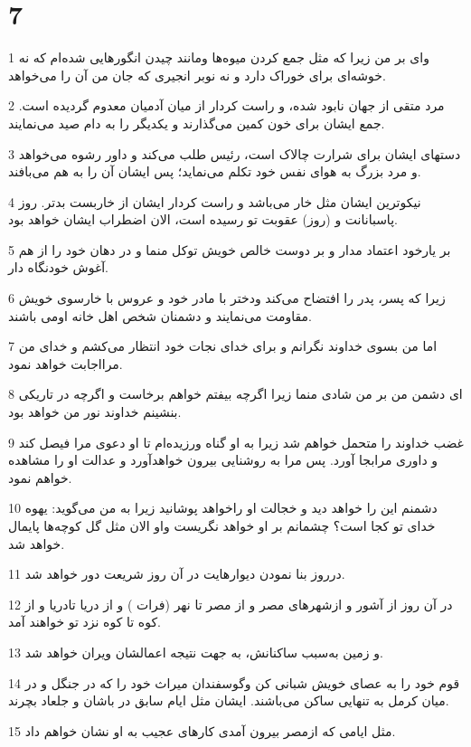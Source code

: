 \chapter{7}

\par 1 وای بر من زیرا که مثل جمع کردن میوه‌ها ومانند چیدن انگورهایی شده‌ام که نه خوشه‌ای برای خوراک دارد و نه نوبر انجیری که جان من آن را می‌خواهد.
\par 2 مرد متقی از جهان نابود شده، و راست کردار از میان آدمیان معدوم گردیده است. جمع ایشان برای خون کمین می‌گذارند و یکدیگر را به دام صید می‌نمایند.
\par 3 دستهای ایشان برای شرارت چالاک است، رئیس طلب می‌کند و داور رشوه می‌خواهد و مرد بزرگ به هوای نفس خود تکلم می‌نماید؛ پس ایشان آن را به هم می‌بافند.
\par 4 نیکوترین ایشان مثل خار می‌باشد و راست کردار ایشان از خاربست بدتر. روز پاسبانانت و (روز) عقوبت تو رسیده است، الان اضطراب ایشان خواهد بود.
\par 5 بر یارخود اعتماد مدار و بر دوست خالص خویش توکل منما و در دهان خود را از هم آغوش خودنگاه دار.
\par 6 زیرا که پسر، پدر را افتضاح می‌کند ودختر با مادر خود و عروس با خارسوی خویش مقاومت می‌نمایند و دشمنان شخص اهل خانه اومی باشند.
\par 7 اما من بسوی خداوند نگرانم و برای خدای نجات خود انتظار می‌کشم و خدای من مرااجابت خواهد نمود.
\par 8 ‌ای دشمن من بر من شادی منما زیرا اگر‌چه بیفتم خواهم برخاست و اگرچه در تاریکی بنشینم خداوند نور من خواهد بود.
\par 9 غضب خداوند را متحمل خواهم شد زیرا به او گناه ورزیده‌ام تا او دعوی مرا فیصل کند و داوری مرابجا آورد. پس مرا به روشنایی بیرون خواهدآورد و عدالت او را مشاهده خواهم نمود.
\par 10 دشمنم این را خواهد دید و خجالت او راخواهد پوشانید زیرا به من می‌گوید: یهوه خدای تو کجا است؟ چشمانم بر او خواهد نگریست واو الان مثل گل کوچه‌ها پایمال خواهد شد.
\par 11 درروز بنا نمودن دیوارهایت در آن روز شریعت دور خواهد شد.
\par 12 در آن روز از آشور و ازشهرهای مصر و از مصر تا نهر (فرات ) و از دریا تادریا و از کوه تا کوه نزد تو خواهند آمد.
\par 13 و زمین به‌سبب ساکنانش، به جهت نتیجه اعمالشان ویران خواهد شد.
\par 14 قوم خود را به عصای خویش شبانی کن وگوسفندان میراث خود را که در جنگل و در میان کرمل به تنهایی ساکن می‌باشند. ایشان مثل ایام سابق در باشان و جلعاد بچرند.
\par 15 مثل ایامی که ازمصر بیرون آمدی کارهای عجیب به او نشان خواهم داد.
